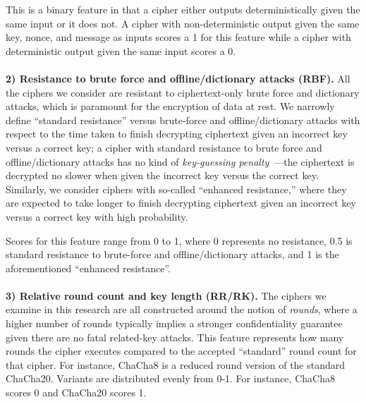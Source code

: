 This is a binary feature in that a cipher either outputs deterministically given
the same input or it does not. A cipher with non-deterministic output given the
same key, nonce, and message as inputs scores a 1 for this feature while a
cipher with deterministic output given the same input scores a 0.\\
\\
\textbf{2) Resistance to brute force and offline/dictionary attacks (RBF).}
All the ciphers we consider are resistant to ciphertext-only brute force and
dictionary attacks, which is paramount for the encryption of data at rest. We
narrowly define ``standard resistance'' versus brute-force and
offline/dictionary attacks with respect to the time taken to finish decrypting
ciphertext given an incorrect key versus a correct key; a cipher with standard
resistance to brute force and offline/dictionary attacks has no kind of
\emph{key-guessing penalty}~\cite{Freestyle}---the ciphertext is decrypted no
slower when given the incorrect key versus the correct key. Similarly, we
consider ciphers with so-called ``enhanced resistance,'' where they are expected
to take longer to finish decrypting ciphertext given an incorrect key versus a
correct key with high probability.

Scores for this feature range from 0 to 1, where 0 represents no resistance, 0.5
is standard resistance to brute-force and offline/dictionary attacks, and 1 is
the aforementioned ``enhanced resistance''.\\
\\
\textbf{3) Relative round count and key length (RR/RK).} The ciphers we examine
in this research are all constructed around the notion of \emph{rounds}, where a
higher number of rounds typically implies a stronger confidentiality guarantee
given there are no fatal related-key attacks. This feature represents how many
rounds the cipher executes compared to the accepted ``standard'' round count for
that cipher. For instance, ChaCha8 is a reduced round version of the standard
ChaCha20. Variants are distributed evenly from 0-1. For instance, ChaCha8 scores
0 and ChaCha20 scores 1\@.

